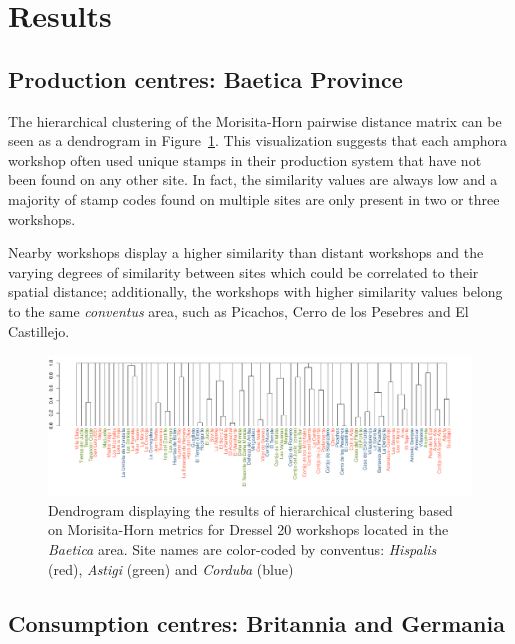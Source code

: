 \documentclass[review]{elsarticle}
\begin{document}
\section{Results}

\subsection{Production centres: Baetica Province}


The hierarchical clustering of the Morisita-Horn pairwise distance matrix can be seen as a dendrogram in Figure~\ref{dendro}. This visualization suggests that each amphora workshop often used unique stamps in their production system that have not been found on any other site. In fact, the similarity values are always low and a majority of stamp codes found on multiple sites are only present in two or three workshops.

Nearby workshops display a higher similarity than distant workshops and the varying degrees of similarity between sites which could be correlated to their spatial distance; additionally, the workshops with higher similarity values belong to the same \textit{conventus} area, such as Picachos, Cerro de los Pesebres and El Castillejo.

\begin{figure}
	\centering
\includegraphics[angle=180, width=\linewidth]{figs/dendro}
\caption{Dendrogram displaying the results of hierarchical clustering based on Morisita-Horn metrics for Dressel 20 workshops located in the \textit{Baetica} area. Site names are color-coded by conventus: \textit{Hispalis} (red), \textit{Astigi} (green) and \textit{Corduba} (blue)}
\label{dendro}
\end{figure} 


\subsection{Consumption centres: Britannia and Germania}
\end{document}
